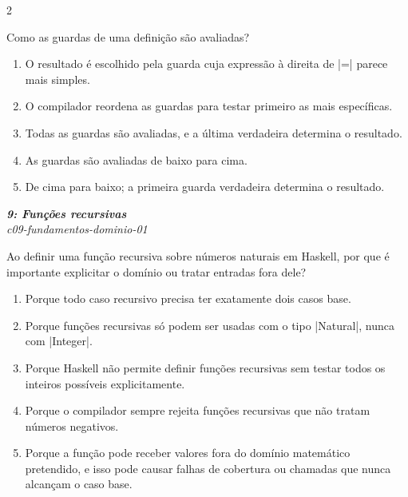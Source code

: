\documentclass[a4paper,10pt,brazil]{article}
\begin{document}
\begin{multicols}{2}
\begin{flushright}
\end{flushright}
Como as guardas de uma definição são avaliadas?

\begin{enumerate}
  \item O resultado é escolhido pela guarda cuja expressão à direita de \haskellinline|=| parece mais simples.

  \item O compilador reordena as guardas para testar primeiro as mais específicas.

  \item Todas as guardas são avaliadas, e a última verdadeira determina o resultado.

  \item As guardas são avaliadas de baixo para cima.

  \item De cima para baixo; a primeira guarda verdadeira determina o resultado.


\end{enumerate}

\begin{flushright}
  \footnotesize
  \textit{\textbf{9: Funções recursivas}}\\
  \textit{c09-fundamentos-dominio-01}\\

\end{flushright}
Ao definir uma função recursiva sobre números naturais em Haskell, por que é importante explicitar o domínio ou tratar entradas fora dele?

\begin{enumerate}
  \item Porque todo caso recursivo precisa ter exatamente dois casos base.

  \item Porque funções recursivas só podem ser usadas com o tipo \haskellinline|Natural|, nunca com \haskellinline|Integer|.

  \item Porque Haskell não permite definir funções recursivas sem testar todos os inteiros possíveis explicitamente.

  \item Porque o compilador sempre rejeita funções recursivas que não tratam números negativos.

  \item Porque a função pode receber valores fora do domínio matemático pretendido, e isso pode causar falhas de cobertura ou chamadas que nunca alcançam o caso base.



\end{enumerate}
\end{multicols}
\end{document}
